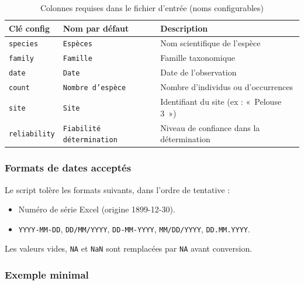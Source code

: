 \documentclass[11pt,a4paper]{article}
\begin{document}
\begin{table}[htbp]
  \centering
  \caption{Colonnes requises dans le fichier d'entrée (noms configurables)}
  \begin{tabularx}{\textwidth}{llX}
    \toprule
    \textbf{Clé config} & \textbf{Nom par défaut} & \textbf{Description} \\
    \midrule
    \texttt{species}     & \texttt{Espèces}               & Nom scientifique de l'espèce \\
    \texttt{family}      & \texttt{Famille}               & Famille taxonomique \\
    \texttt{date}        & \texttt{Date}                  & Date de l'observation \\
    \texttt{count}       & \texttt{Nombre d'espèce}       & Nombre d'individus ou d'occurrences \\
    \texttt{site}        & \texttt{Site}                  & Identifiant du site (ex : «~Pelouse 3~») \\
    \texttt{reliability} & \texttt{Fiabilité détermination} & Niveau de confiance dans la détermination \\
    \bottomrule
  \end{tabularx}
\end{table}

\subsubsection{Formats de dates acceptés}

Le script tolère les formats suivants, dans l'ordre de tentative :
\begin{itemize}
  \item Numéro de série Excel (origine 1899-12-30).
  \item \texttt{YYYY-MM-DD}, \texttt{DD/MM/YYYY}, \texttt{DD-MM-YYYY}, \texttt{MM/DD/YYYY}, \texttt{DD.MM.YYYY}.
\end{itemize}

Les valeurs vides, \texttt{NA} et \texttt{NaN} sont remplacées par \texttt{NA} avant conversion.

\subsubsection{Exemple minimal}
\end{document}
